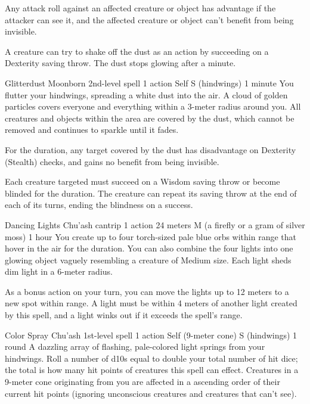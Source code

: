 Any attack roll against an affected creature or object has advantage if the attacker can see it, and the affected creature or object can't benefit from being invisible.

A creature can try to shake off the dust as an action by succeeding on a Dexterity saving throw.
The dust stops glowing after a minute.

\DndSpellHeader %
    {Glitterdust \label{spell::glitterdust}}
    {Moonborn 2nd-level spell}
    {1 action}
    {Self}
    {S (hindwings)}
    {1 minute}
You flutter your hindwings, spreading a white dust into the air.
A cloud of golden particles covers everyone and everything within a 3-meter radius around you.
All creatures and objects within the area are covered by the dust, which cannot be removed and continues to sparkle until it fades.

For the duration, any target covered by the dust has disadvantage on Dexterity (Stealth) checks, and gains no benefit from being invisible.

Each creature targeted must succeed on a Wisdom saving throw or become blinded for the duration.
The creature can repeat its saving throw at the end of each of its turns, ending the blindness on a success.

\DndSpellHeader %
    {Dancing Lights \label{spell::dancinglights}}
    {Chu'ash cantrip}
    {1 action}
    {24 meters}
    {M (a firefly or a gram of silver moss)}
    {1 hour}
You create up to four torch-sized pale blue orbs within range that hover in the air for the duration.
You can also combine the four lights into one glowing object vaguely resembling a creature of Medium size.
Each light sheds dim light in a 6-meter radius.

As a bonus action on your turn, you can move the lights up to 12 meters to a new spot within range.
A light must be within 4 meters of another light created by this spell, and a light winks out if it exceeds the spell's range.

\DndSpellHeader %
    {Color Spray \label{spell::colorspray}}
    {Chu'ash 1st-level spell}
    {1 action}
    {Self (9-meter cone)}
    {S (hindwings)}
    {1 round}
A dazzling array of flashing, pale-colored light springs from your hindwings.
Roll a number of d10s equal to double your total number of hit dice; the total is how many hit points of creatures this spell can effect.
Creatures in a 9-meter cone originating from you are affected in a ascending order of their current hit points (ignoring unconscious creatures and creatures that can't see).

